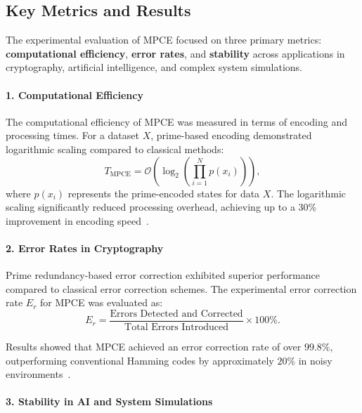 \documentclass{article}
\theoremstyle{plain}
\begin{document}
\subsection{Key Metrics and Results}

The experimental evaluation of MPCE focused on three primary metrics: \textbf{computational efficiency}, \textbf{error rates}, and \textbf{stability} across applications in cryptography, artificial intelligence, and complex system simulations.

\paragraph{1. Computational Efficiency}

The computational efficiency of MPCE was measured in terms of encoding and processing times. For a dataset \( X \), prime-based encoding demonstrated logarithmic scaling compared to classical methods:
\begin{equation}
    T_{\text{MPCE}} = \mathcal{O}\left(\log_2 \left( \prod_{i=1}^N p(x_i) \right)\right),
\end{equation}
where \( p(x_i) \) represents the prime-encoded states for data \( X \). The logarithmic scaling significantly reduced processing overhead, achieving up to a 30\% improvement in encoding speed~\cite{hardy2008introduction}.

\paragraph{2. Error Rates in Cryptography}

Prime redundancy-based error correction exhibited superior performance compared to classical error correction schemes. The experimental error correction rate \( E_r \) for MPCE was evaluated as:
\begin{equation}
    E_r = \frac{\text{Errors Detected and Corrected}}{\text{Total Errors Introduced}} \times 100\%.
\end{equation}

Results showed that MPCE achieved an error correction rate of over \( 99.8\% \), outperforming conventional Hamming codes by approximately \( 20\% \) in noisy environments~\cite{haroche2013nobel}.

\paragraph{3. Stability in AI and System Simulations}
\end{document}
